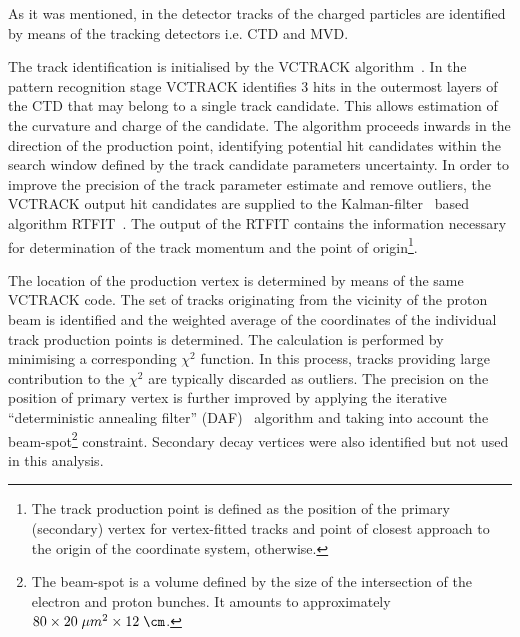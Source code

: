 As it was mentioned, in the \zeus detector tracks of the charged particles are identified by means of the tracking detectors i.e. CTD and MVD.

The track identification is initialised by the VCTRACK algorithm~\cite{upub:hartner:zn9858,upub:hartner:zn9764}. In the pattern recognition stage VCTRACK identifies 3 hits in the outermost layers of the CTD that may belong to a single track candidate. This allows estimation of the curvature and charge of the candidate. The algorithm proceeds inwards in the direction of the production point, identifying potential hit candidates within the search window defined by the track candidate parameters uncertainty. In order to improve the precision of the track parameter estimate and remove outliers, the VCTRACK output hit candidates are supplied to the Kalman-filter~\cite{Klaman:1960} based algorithm RTFIT~\cite{upub:spiridonov:rtfit}. The output of the RTFIT contains the information necessary for determination of the track momentum and the point of origin\footnote{The track production point is defined as the position of the primary (secondary) vertex for vertex-fitted tracks and point of closest approach to the origin of the coordinate system, otherwise.}.

The location of the production vertex is determined by means of the same VCTRACK code. The set of tracks originating from the vicinity of the proton beam is identified and the weighted average of the coordinates of the individual track production points is determined. The calculation is performed by minimising a corresponding $\chi^2$ function. In this process, tracks providing large contribution to the $\chi^2$ are typically discarded as outliers. The precision on the position of primary vertex is further improved by applying the iterative ``deterministic annealing filter'' (DAF)~\cite{Fruewirth:2010} algorithm and taking into account the beam-spot\footnote{The beam-spot is a volume defined by the size of the intersection of the electron and proton bunches. It amounts to approximately $80 \times 20\; \mu m^{2} \times 12\; \cm$.} constraint. Secondary decay vertices were also identified but not used in this analysis.